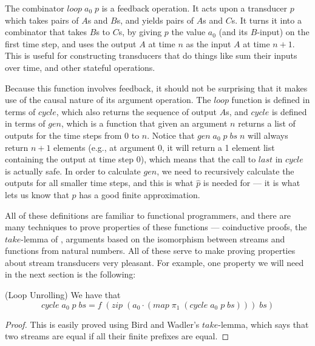 The combinator $\mathit{loop}\;a_0\;p$ is a feedback operation. It acts
upon a transducer $p$ which takes pairs of $A$s and $B$s, and yields
pairs of $A$s and $C$s. It turns it into a combinator that takes $B$s
to $C$s, by giving $p$ the value $a_0$ (and its $B$-input) on the
first time step, and uses the output $A$ at time $n$ as the input $A$
at time $n+1$. This is useful for constructing transducers that do
things like sum their inputs over time, and other stateful operations. 

Because this function involves feedback, it should not be surprising
that it makes use of the causal nature of its argument operation. The
$\mathit{loop}$ function is defined in terms of $\mathit{cycle}$, which also returns the
sequence of output $A$s, and $\mathit{cycle}$ is defined in terms of $\mathit{gen}$,
which is a function that given an argument $n$ returns a list of
outputs for the time steps from $0$ to $n$. Notice that
$\mathit{gen}\;a_0\;p\;bs\;n$ will always return $n+1$ elements (e.g., at
argument 0, it will return a 1 element list containing the output at
time step 0), which means that the call to $\mathit{last}$ in $\mathit{cycle}$ is
actually safe. In order to calculate $\mathit{gen}$, we need to recursively
calculate the outputs for all smaller time steps, and this is what
$\hat{p}$ is needed for --- it is what lets us know that $p$ has a good
finite approximation.

All of these definitions are familiar to functional programmers, and
there are many techniques to prove properties of these functions ---
coinductive proofs, the $\mathit{take}$-lemma of \citet{bird-wadler}, arguments based on
the isomorphism between streams and functions from natural
numbers. All of these serve to make proving properties about stream
transducers very pleasant. For example, one property we will need in
the next section is the following:

\begin{lemma}{(Loop Unrolling)} We have that 
  \begin{displaymath}
    cycle\;a_0\;p\;bs = f\;(zip\;(a_0\cdot(map\;\pi_1\;(cycle\;a_0\;p\;bs)))\;bs)
  \end{displaymath}
\end{lemma}

\begin{proof}
  This is easily proved using Bird and Wadler's $take$-lemma, which
  says that two streams are equal if all their finite prefixes are
  equal.
\end{proof}


